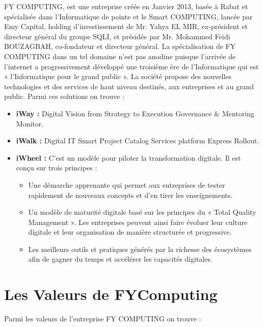 \documentclass[a4paper,11pt,oneside]{report}
\begin{document}
FY COMPUTING, est  une entreprise créée en Janvier 2013, basée à Rabat et spécialisée dans l’Informatique de pointe et le Smart COMPUTING, lancée par Emy Capital, holding d’investissement de  Mr. Yahya EL MIR, ex-président et directeur général du groupe SQLI, et présidée par  Mr. Mohammed Feidi BOUZAGBAH, co-fondateur et directeur général. 
\newline
\newline
La spécialisation de FY COMPUTING dans un tel domaine n’est pas anodine puisque l’arrivée de l’internet a progressivement développé une troisième ère de l’Informatique qui est « l’Informatique pour le grand public ».          
\newline
\newline
La  société propose des nouvelles technologies et des services de haut niveau destinés, aux entreprises et au grand public. Parmi ces solutions on trouve :

\begin{itemize}
\item \textbf{iWay :} Digital Vision from Strategy to Execution Governance \& Mentoring  Monitor.
\item \textbf{iWalk :} Digital IT Smart Project Catalog Services platform Express Rollout.
\item \textbf{iWheel :} C'est un modèle pour piloter la transformation digitale. Il est conçu sur trois principes :

\begin{itemize}
\item Une démarche apprenante qui permet aux entreprises de tester rapidement de nouveaux concepts et d’en tirer les enseignements.

\item Un modèle de maturité digitale basé sur les principes du « Total Quality Management ». Les entreprises peuvent ainsi faire évoluer leur culture digitale et leur organisation de manière structurée et progressive.

\item Les meilleurs outils et pratiques générés par la richesse des écosystèmes afin de gagner du temps et accélérer les capacités digitales.
\end{itemize}
\end{itemize}

\section{Les Valeurs de FYComputing}
Parmi les valeurs de l’entreprise FY COMPUTING on trouve : 
\end{document}

